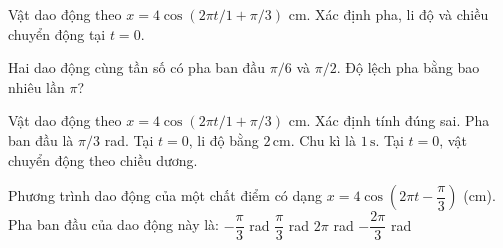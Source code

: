 \begin{ex}
Vật dao động theo $x=4\cos(2\pi t/1+\pi/3)$ cm. Xác định pha, li độ và chiều chuyển động tại $t=0$.
\choiceTF

\end{ex}

\begin{ex}
Hai dao động cùng tần số có pha ban đầu $\pi/6$ và $\pi/2.$ Độ lệch pha bằng bao nhiêu lần $\pi$?
\end{ex}

\begin{ex}
Vật dao động theo $x=4\cos(2\pi t/1+\pi/3)$ cm. Xác định tính đúng sai.
\choiceTF
{\True Pha ban đầu là $\pi/3$ rad.}
{\True Tại $t=0$, li độ bằng $2\,\text{cm}$.}
{\True Chu kì là $1\,\text{s}$.}
{Tại $t=0$, vật chuyển động theo chiều dương.}
\end{ex}

\begin{ex}
Phương trình dao động của một chất điểm có dạng $x = 4\cos\left(2\pi t - \dfrac{\pi}{3}\right)$ (cm). Pha ban đầu của dao động này là:
\choice
{\True $-\dfrac{\pi}{3}$ rad}
{$\dfrac{\pi}{3}$ rad}
{$2\pi$ rad}
{$-\dfrac{2\pi}{3}$ rad}
\end{ex}

